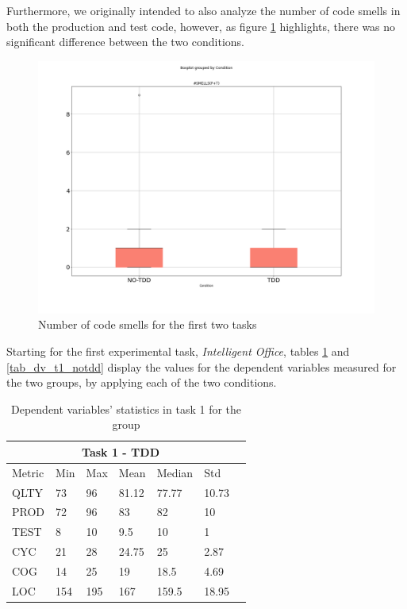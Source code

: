 Furthermore, we originally intended to also analyze the number of code smells in both the production and test code, however, as figure \ref{bp_task1_2_smells} highlights, there was no significant difference between the two conditions.

\begin{figure}[h]
    \centering
    \includegraphics[width=\linewidth]{figures/box_plots/SMELLS.png}
    \caption{Number of code smells for the first two tasks}
    \label{bp_task1_2_smells}
\end{figure}





\noindent Starting for the first experimental task, \textit{Intelligent Office}, tables \ref{tab_dv_t1_tdd} and \ref{tab_dv_t1_notdd} display the values for the dependent variables measured for the two groups, by applying each of the two conditions.

\begin{table}[!h]
    \begin{center} 
        \begin{tabular}{|p{1.8cm}||p{1.6cm}|p{1.6cm}|p{1.6cm}|p{1.6cm}|p{1.6cm}|p{1.6cm}|}
            \hline
                \multicolumn{6}{|c|}{Task 1 - TDD} \\
            \hline
                Metric & Min & Max & Mean & Median & Std \\
            \hline
                QLTY & 73 & 96 & 81.12 & 77.77 & 10.73 \\
                PROD & 72 & 96 & 83 & 82 & 10 \\
                TEST & 8 & 10 & 9.5 & 10 & 1 \\
                CYC & 21 & 28 & 24.75 & 25 & 2.87 \\
                COG & 14 & 25 & 19 & 18.5 & 4.69 \\
                LOC & 154 & 195 & 167 & 159.5 & 18.95 \\
            \hline
        \end{tabular}
        \caption{\label{tab_dv_t1_tdd}Dependent variables' statistics in task 1 for the \tdd group}
    \end{center}
\end{table}


